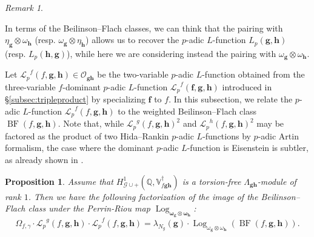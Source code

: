 \documentclass[a4paper,11pt]{amsart}
\theoremstyle{plain}
\newtheorem{proposition}[theorem]{Proposition}
\theoremstyle{definition}
\theoremstyle{remark}
\newtheorem{remarkwr}[theorem]{Remark}
\newenvironment{remark}{\begin{remarkwr}\begin{upshape}}{\end{upshape}\end{remarkwr}}
\newcommand{\bb}{\mathbb}
\newcommand{\cl}{\mathcal}
\DeclareMathOperator{\BF}{BF}
\DeclareMathOperator{\Eis}{Eis}
\DeclareMathOperator{\Log}{Log}
\newcommand{\Lp}{{\mathscr{L}_p}}
\newcommand{\hf}{{\mathbf{f}}}
\newcommand{\hg}{{\mathbf{g}}}
\newcommand{\hh}{{\mathbf h}}
\numberwithin{equation}{section}
\begin{document}
\begin{remark}\label{rk:other-proj}
In terms of the Beilinson--Flach classes, we can think that the pairing with $\eta_{\hg} \otimes \omega_{\hh}$ (resp. $\omega_{\hg} \otimes \eta_{\hh}$) allows us to recover the $p$-adic $L$-function $L_p(\hg,\hh)$ (resp. $L_p(\hh,\hg)$), while here we are considering instead the pairing with $\omega_{\hg} \otimes \omega_{\hh}$.
\end{remark}

Let $\Lp^f(f,\hg,\hh)\in \cl{O}_{\hg\hh}$ be the two-variable $p$-adic $L$-function obtained from the three-variable $f$-dominant $p$-adic $L$-function $\Lp^f(\hf,\hg,\hh)$ introduced in \S\ref{subsec:tripleproduct} by specializing $\hf$ to $f$. In this subsection, we relate the $p$-adic $L$-function $\Lp^f(f,\hg,\hh)$ to the weighted Beilinson--Flach class $\BF(f,\hg,\hh)$. %
Note that, while $\Lp^g(f, \hg, \hh)^2$ and $\Lp^h(f, \hg, \hh)^2$ may be factored as the product of two Hida--Rankin $p$-adic $L$-functions by $p$-adic Artin formalism, %
the case where the dominant $p$-adic $L$-function is Eisenstein is subtler, as already shown in \cite{BC}. %

\begin{proposition}
Assume that $H^1_{\cl{G}\cup +}(\bb{Q}, \bb{V}_{f\hg\hh}^\dagger)$ is a torsion-free $\Lambda_{\hg\hh}$-module of rank $1$. Then we have the following factorization of the image of the Beilinson--Flach class under the Perrin-Riou map $\Log_{\bm{\omega}_{\hg} \otimes \bm{\omega}_{\hh}}$: %
\[ \Omega_{f,\gamma} \cdot \Lp^g(f,\hg,\hh) \cdot \Lp^f(f, \hg, \hh) =  \lambda_{N_g}(\hg) \cdot \Log_{\omega_{\hg} \otimes \omega_{\hh}}(\BF(f, \hg, \hh)). \] 
\end{proposition}
\end{document}

